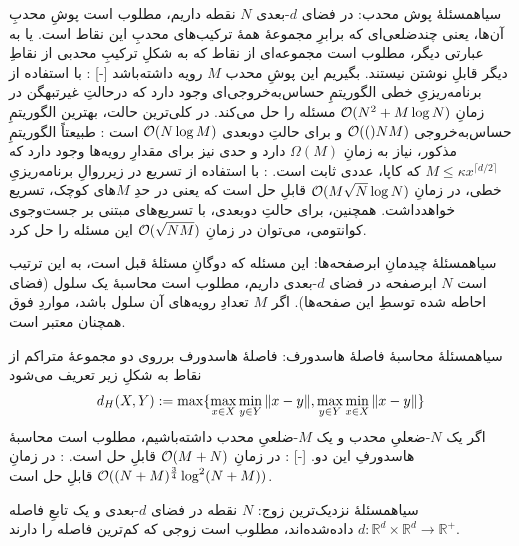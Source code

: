 ‌سیاه{مسئلهٔ پوش محدب}: در فضای $d$-بعدی $N$ نقطه داریم، مطلوب است پوشِ محدبِ آن‌ها، یعنی چندضلعی‌ای که برابرِ مجموعهٔ همهٔ ترکیب‌های محدبِ این نقاط است. یا به عبارتی دیگر، مطلوب است مجموعه‌ای از نقاط که به شکلِ ترکیبِ محدبی از نقاطِ دیگر قابلِ نوشتن نیستند. بگیریم این پوشِ محدب $M$ رویه داشته‌باشد 
[-]
    : با استفاده از برنامه‌ریزیِ خطی الگوریتمِ حساس‌به‌خروجی‌ای وجود دارد که درحالتِ غیرتبهگن
    در زمانِ
    $\mathcal{O}(N^2 + M\log N)$
    مسئله را حل می‌کند. در کلی‌ترین حالت، بهترین الگوریتمِ حساس‌به‌خروجی 
    $\mathcal{O}(()NM)$
    و برای حالتِ دوبعدی 
    $\mathcal{O}(N \log M)$
    است
    : طبیعتاً الگوریتمِ مذکور، نیاز به زمانِ 
    $\Omega(M)$
    دارد و حدی نیز برای مقدارِ رویه‌ها وجود دارد که
    $M \le \kappa x^{\lceil d/2 \rceil}$
    که کاپا، عددی ثابت است.
    : با استفاده از تسریع در زیرروالِ برنامه‌ریزیِ خطی، در زمانِ
    $\mathcal{O}(M \sqrt{N} \log N)$
    قابلِ حل است که یعنی در حدِ $M$های کوچک، تسریع خواهدداشت.
    همچنین، برای حالتِ دوبعدی، با تسریع‌های مبتنی بر جست‌وجوی کوانتومی، می‌توان در زمانِ
    $\mathcal{O}(\sqrt{NM})$
    این مسئله را حل کرد.

‌سیاه{مسئلهٔ چیدمانِ ابرصفحه‌ها}: این مسئله که دوگانِ مسئلهٔ قبل است، به این ترتیب است $N$ ابرصفحه در فضای $d$-بعدی داریم، مطلوب است محاسبهٔ یک سلول (فضای احاطه شده توسطِ این صفحه‌ها).
اگر $M$ تعدادِ رویه‌های آن سلول باشد، مواردِ فوق همچنان معتبر است.

‌سیاه{مسئلهٔ محاسبهٔ فاصلهٔ هاسدورف:} فاصلهٔ هاسدورف برروی دو مجموعهٔ متراکم از نقاط به شکلِ زیر تعریف می‌شود
\begin{equation}
    d_H(X, Y) := \max \{ \max_{x \in X} \min_{y \in Y} \norm{x - y}, \max_{y \in Y} \min_{x \in X} \norm{x - y} \}
\end{equation}
اگر یک $N$-ضعلیِ محدب و یک $M$-ضلعیِ محدب داشته‌باشیم، مطلوب است محاسبهٔ هاسدورفِ این دو.  
[-]
    : در زمانِ 
    $\mathcal{O}(M + N)$
    قابلِ حل است.
    : در زمانِ
    $\mathcal{O}((N+M)^{\frac{3}{4}} \log^2 (N+M))$
    قابلِ حل است.

‌سیاه{مسئلهٔ نزدیک‌ترین زوج}: 
\(N\)
نقطه در فضای \(d\)-بعدی و یک تابعِ فاصله 
\(d: \mathbb{R}^d \times \mathbb{R}^d \to \mathbb{R}^+\)
داده‌شده‌اند، مطلوب است زوجی که کم‌ترین فاصله را دارند. 

